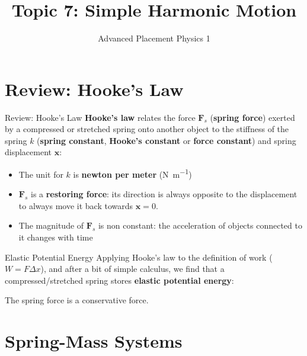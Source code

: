 \documentclass[12pt,compress,aspectratio=169]{beamer}
\title{Topic 7: Simple Harmonic Motion}
\subtitle{Advanced Placement Physics 1}
\begin{document}
\begin{frame}
  \maketitle
\end{frame}


\section{Review: Hooke's Law}

\begin{frame}{Review: Hooke's Law}
  \textbf{Hooke's law} relates the force $\bm{F}_s$ (\textbf{spring force})
  exerted by a compressed or stretched spring onto another object to the
  stiffness of the spring $k$ (\textbf{spring constant}, \textbf{Hooke's
    constant} or \textbf{force constant}) and spring displacement $\bm{x}$:


  \begin{itemize}
  \item\vspace{-.1in}The unit for $k$ is \textbf{newton per meter}
    (\si{\newton\per\metre})
  \item $\bm{F}_s$ is a \textbf{restoring force}: its direction is always
    opposite to the displacement to always move it back towards $\bm{x}=0$.
  \item The magnitude of $\bm{F}_s$ is non constant: the acceleration of
    objects connected to it changes with time
  \end{itemize}
\end{frame}



\begin{frame}{Elastic Potential Energy}
  Applying Hooke's law to the  definition of work ($W=F\Delta x$), and after a
  bit of simple calculus, we find that a compressed/stretched spring stores
  \textbf{elastic potential energy}:
  

  The spring force is a conservative force.
\end{frame}



\section{Spring-Mass Systems}
\end{document}
